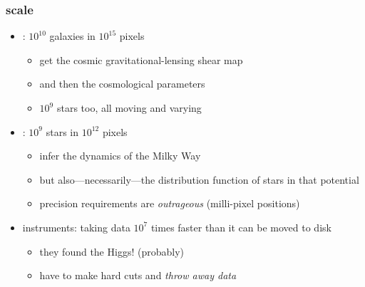 \documentclass[pdftex]{beamer}
\begin{document}
{
\begin{frame}[plain]\end{frame}}
{
\begin{frame}[plain]\end{frame}}
{
\begin{frame}[plain]\end{frame}}
{
\begin{frame}[plain]\end{frame}}
{
\begin{frame}[plain]\end{frame}}

\begin{frame}
  \frametitle{scale}
  \begin{itemize}
  \item {}: $10^{10}$ galaxies in $10^{15}$ pixels
    \begin{itemize}
    \item get the cosmic gravitational-lensing shear map
    \item and then the cosmological parameters
    \item $10^9$ stars too, all moving and varying
    \end{itemize}
  \item {}: $10^{9}$ stars in $10^{12}$ pixels
    \begin{itemize}
    \item infer the dynamics of the Milky Way
    \item but also---necessarily---the distribution function of stars
      in that potential
    \item precision requirements are \emph{outrageous} (milli-pixel positions)
    \end{itemize}
  \item {} instruments: taking data $10^7$ times faster than it can be moved to disk
    \begin{itemize}
    \item they found the Higgs! (probably)
    \item have to make hard cuts and \emph{throw away data}
    \end{itemize}
  \end{itemize}
\end{frame}
\end{document}

